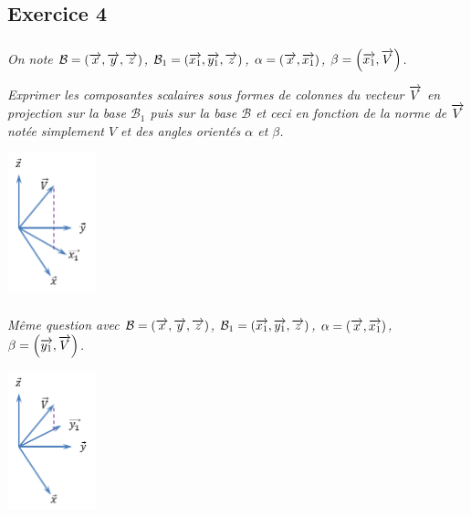 \documentclass[11pt,oneside]{article}
\begin{document}

\subsection*{Exercice 4}

\begin{minipage}[c]{.7\linewidth}
\subparagraph{}
\textit{On note $\mathcal{B}=(\overrightarrow{x},\overrightarrow{y},\overrightarrow{z})$, $\mathcal{B}_1=(\overrightarrow{x_1},\overrightarrow{y_1},\overrightarrow{z})$,  $\alpha=\left(\overrightarrow{x},\overrightarrow{x_1}\right)$, $\beta=\left(\overrightarrow{x_1},\overrightarrow{V} \right)$.}

\textit{Exprimer les composantes scalaires sous formes de colonnes du vecteur $\overrightarrow{V}$ en projection sur la base $\mathcal{B}_1$ puis sur la base $\mathcal{B}$ et ceci en fonction de la norme de $\overrightarrow{V}$ notée simplement $V$ et des angles orientés $\alpha$ et $\beta$. }
\end{minipage} \hfill
\begin{minipage}[c]{.29\linewidth}
\begin{center}
\includegraphics[height=4cm]{png/exo4_1}
\end{center}
\end{minipage}



\begin{minipage}[c]{.7\linewidth}
\subparagraph{}
\textit{Même question avec $\mathcal{B}=(\overrightarrow{x},\overrightarrow{y},\overrightarrow{z})$, $\mathcal{B}_1=(\overrightarrow{x_1},\overrightarrow{y_1},\overrightarrow{z})$,  $\alpha=\left(\overrightarrow{x},\overrightarrow{x_1}\right)$, $\beta=\left(\overrightarrow{y_1},\overrightarrow{V} \right)$.}
\end{minipage} \hfill
\begin{minipage}[c]{.29\linewidth}
\begin{center}
\includegraphics[height=4cm]{png/exo4_2}
\end{center}
\end{minipage}
\end{document}

